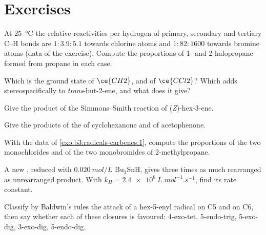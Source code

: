 \section{Exercises}

\begin{exercise}[$\star$]\label{exo:b3:radicals-carbenes:1}
At \qty{25}{\celsius} the relative reactivities per hydrogen of primary, secondary and
tertiary C--H bonds are $1 : 3.9 : 5.1$ towards chlorine atoms and $1 : 82 : 1600$ towards
bromine atoms (data of the exercise). Compute the proportions of 1- and 2-halopropane
formed from propane in each case.
\end{exercise}

\begin{exercise}[$\star$]\label{exo:b3:radicals-carbenes:2}
Which is the ground state of $\ce{CH2}$, and of $\ce{CCl2}$? Which adds stereospecifically to
\textit{trans}-but-2-ene, and what does it give?
\end{exercise}

\begin{exercise}[$\star$]\label{exo:b3:radicals-carbenes:3}
Give the product of the Simmons--Smith reaction of (\textit{Z})-hex-3-ene.
\end{exercise}

\begin{exercise}[$\star$]\label{exo:b3:radicals-carbenes:4}
Give the products of the  of cyclohexanone and of
acetophenone.
\end{exercise}

\begin{exercise}[$\star\star$]\label{exo:b3:radicals-carbenes:5}
With the data of \cref{exo:b3:radicals-carbenes:1}, compute the proportions of
the two monochlorides and of the two monobromides of 2-methylpropane.
\end{exercise}

\begin{exercise}[$\star\star$]\label{exo:b3:radicals-carbenes:6}
A new , reduced with $\qty{0.020}{mol/L}$ $\mathrm{Bu_3SnH}$, gives three times as much rearranged
as unrearranged product. With $k_H = \qty{2.4e6}{L.mol^{-1}.s^{-1}}$, find its rate constant.
\end{exercise}

\begin{exercise}[$\star\star$]\label{exo:b3:radicals-carbenes:7}
Classify by Baldwin's rules the attack of a hex-5-enyl radical on C5 and on C6,
then say whether each of these closures is favoured: 4-exo-tet, 5-endo-trig,
5-exo-dig, 3-exo-dig, 5-endo-dig.
\end{exercise}

